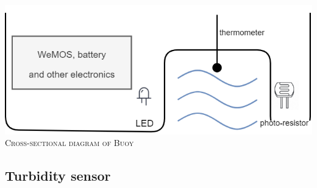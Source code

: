 \documentclass{article}
\begin{document}
\begin{multicols}{2}
\begin{center}
 \includegraphics[width=\columnwidth]{report/images/buoy-cross-section.png}\\
 \textsc{Cross-sectional diagram of Buoy}

\end{center}


\end{multicols}

\newpage
\subsection{Turbidity sensor}
\end{document}
